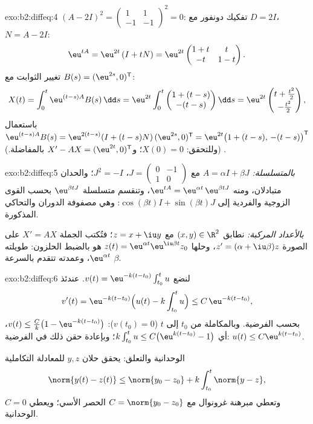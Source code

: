 \begin{solution}{exo:b2:diffeq:4}
$(A - 2I)^2 = \begin{pmatrix}1 & 1\\ -1 & -1\end{pmatrix}^2 = 0$:
تفكيك دونفور مع $D = 2I$، $N = A - 2I$:
\[
\eu^{tA} = \eu^{2t}\,(I + tN)
= \eu^{2t}\begin{pmatrix} 1 + t & t\\ -t & 1 - t\end{pmatrix}.
\]
تغيير الثوابت مع $B(s) = (\eu^{2s}, 0)^{\mathsf T}$:
\[
X(t) = \int_0^t \eu^{(t-s)A}B(s)\,\dd s
= \eu^{2t}\int_0^t \begin{pmatrix} 1 + (t-s)\\ -(t-s)
\end{pmatrix}\dd s
= \eu^{2t}\begin{pmatrix} t + \frac{t^2}{2}\\[2pt] -\frac{t^2}{2}
\end{pmatrix},
\]
باستعمال $\eu^{(t-s)A}B(s) = \eu^{2(t-s)}(I + (t-s)N)\,(\eu^{2s},
0)^{\mathsf T} = \eu^{2t}\bigl(1 + (t-s),\, -(t-s)\bigr)^{\mathsf
T}$. (وللتحقق: $X(0) = 0$؛ و$X' - AX = (\eu^{2t}, 0)^{\mathsf T}$ بالمفاضلة.)
\end{solution}

\begin{solution}{exo:b2:diffeq:5}
\emph{بالمتسلسلة:} $A = \alpha I + \beta J$ مع $J =
\begin{pmatrix}0 & -1\\ 1 & 0\end{pmatrix}$، $J^2 = -I$؛ والحدان متبادلان، ومنه
$\eu^{tA} = \eu^{\alpha t}\,\eu^{\beta tJ}$، وتنقسم متسلسلة $\eu^{\beta t J}$ بحسب القوى الزوجية والفردية إلى $\cos(\beta t)I + \sin(\beta t)J$:
وهي مصفوفة الدوران والتحاكي المذكورة.

\emph{بالأعداد المركبة:} نطابق $(x, y) \in \R^2$ مع $z = x + \iu y$؛ فتُكتب الجملة $X' = AX$
على الصورة $z' = (\alpha + \iu\beta)z$، وحلها $z(t) = \eu^{\alpha t}\eu^{\iu\beta t}z_0$ هو بالضبط الحلزون: طويلته $\eu^{\alpha t}$،
وعمدته تتقدم بالسرعة $\beta$.
\end{solution}

\begin{solution}{exo:b2:diffeq:6}
لنضع $v(t) = \eu^{-k(t - t_0)}\int_{t_0}^t u$. عندئذ
\[
v'(t) = \eu^{-k(t-t_0)}\Bigl(u(t) - k\int_{t_0}^t u\Bigr)
\leq C\,\eu^{-k(t-t_0)},
\]
بحسب الفرضية. وبالمكاملة من $t_0$ إلى $t$ ($v(t_0) = 0$): $v(t) \leq \frac{C}{k}\bigl(1 - \eu^{-k(t - t_0)}\bigr)$، أي
$k\int_{t_0}^t u \leq C\bigl(\eu^{k(t-t_0)} - 1\bigr)$؛ وبإعادة حقن ذلك في الفرضية: $u(t) \leq C\eu^{k(t-t_0)}$.

الوحدانية والتعلق: يحقق حلان $y, z$ للمعادلة التكاملية
\[
\norm{y(t) - z(t)} \leq \norm{y_0 - z_0} +
k\int_{t_0}^{t}\norm{y - z},
\]
وتعطي مبرهنة غرونوال مع $C = \norm{y_0 - z_0}$ الحصر الأسي؛ ويعطي $C = 0$ الوحدانية.
\end{solution}

